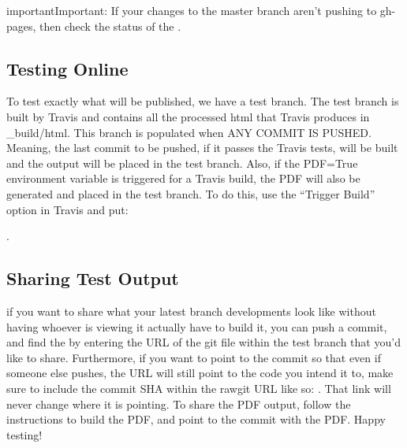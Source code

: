\documentclass[letterpaper,10pt,english]{sphinxmanual}
\begin{document}
\begin{sphinxadmonition}{important}{Important:}
If your changes to the master branch aren’t pushing to gh-pages, then check the status of the .
\end{sphinxadmonition}


\subsection{Testing Online}
\label{\detokenize{Textbook_Creation_Help/rst_intro:testing-online}}\label{\detokenize{Textbook_Creation_Help/rst_intro:heading-testing-online}}
To test exactly what will be published, we have a test branch. The test branch is built by Travis and contains all the processed html that Travis produces in \_build/html. This branch is populated when ANY COMMIT IS PUSHED. Meaning, the last commit to be pushed, if it passes the Travis tests, will be built and the output will be placed in the test branch. Also, if the PDF=True environment variable is triggered for a Travis build, the PDF will also be generated and placed in the test branch. To do this, use the “Trigger Build” option in Travis and put:

%
\begin{sphinxVerbatim}[commandchars=\\\{\}]
     
\end{sphinxVerbatim}

.


\subsection{Sharing Test Output}
\label{\detokenize{Textbook_Creation_Help/rst_intro:sharing-test-output}}
if you want to share what your latest branch developments look like without having whoever is viewing it actually have to build it, you can push a commit, and find the  by entering the URL of the git file within the test branch that you’d like to share. Furthermore, if you want to point to the commit so that even if someone else pushes, the URL will still point to the code you intend it to, make sure to include the commit SHA within the rawgit URL like so: . That link will never change where it is pointing. To share the PDF output, follow the {\hyperref[\detokenize{Textbook_Creation_Help/rst_intro:heading-testing-online}]{}} instructions to build the PDF, and point to the commit with the PDF. Happy testing!
\end{document}

